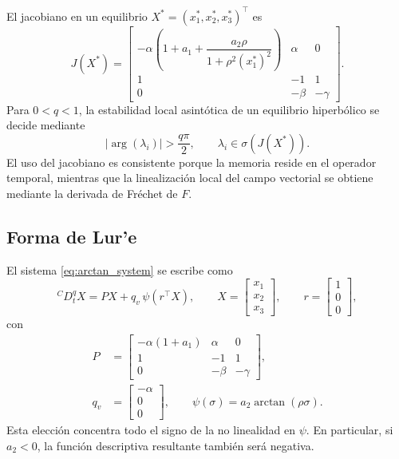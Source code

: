 \documentclass[journal]{IEEEtran}
\begin{document}
El jacobiano en un equilibrio $X^*=(x_1^*,x_2^*,x_3^*)^\top$ es
\begin{equation}
\label{eq:jac_arctan}
J(X^*)=
\begin{bmatrix}
-\alpha\left(1+a_1+\dfrac{a_2\rho}{1+\rho^2(x_1^*)^2}\right) & \alpha & 0\\[2mm]
1&-1&1\\
0&-\beta&-\gamma
\end{bmatrix}.
\end{equation}
Para $0<q<1$, la estabilidad local asintótica de un equilibrio hiperbólico se decide mediante
\begin{equation}
\label{eq:matignon_arctan}
|\arg(\lambda_i)|>\frac{q\pi}{2},
\qquad \lambda_i\in\sigma(J(X^*)).
\end{equation}
El uso del jacobiano es consistente porque la memoria reside en el operador temporal, mientras que la linealización local del campo vectorial se obtiene mediante la derivada de Fréchet de $F$.

\subsection{Forma de Lur'e}

El sistema \eqref{eq:arctan_system} se escribe como
\begin{equation}
\label{eq:lure_arctan}
{}^{C}D_t^q X=P X+q_v\,\psi(r^\top X),
\qquad
X=\begin{bmatrix}x_1\\x_2\\x_3\end{bmatrix},
\qquad
r=\begin{bmatrix}1\\0\\0\end{bmatrix},
\end{equation}
con
\begin{equation}
\label{eq:Pqpsi_arctan}
\begin{aligned}
P&=\begin{bmatrix}
-\alpha(1+a_1)&\alpha&0\\
1&-1&1\\
0&-\beta&-\gamma
\end{bmatrix},\\
q_v&=\begin{bmatrix}-\alpha\\0\\0\end{bmatrix},
\qquad
\psi(\sigma)=a_2\arctan(\rho\sigma).
\end{aligned}
\end{equation}
Esta elección concentra todo el signo de la no linealidad en $\psi$. En particular, si $a_2<0$, la función descriptiva resultante también será negativa.
\end{document}
